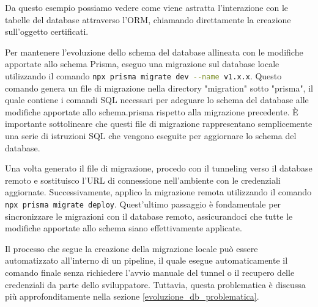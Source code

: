 

Da questo esempio possiamo vedere come viene astratta l'interazione con le tabelle del database attraverso l'ORM, chiamando direttamente la creazione sull'oggetto certificati.

\vspace{0,3cm}

Per mantenere l'evoluzione dello schema del database allineata con le modifiche apportate allo schema Prisma, eseguo una migrazione sul database locale utilizzando il comando \lstinline[language=Bash]{npx prisma migrate dev --name v1.x.x}. Questo comando genera un file di migrazione nella directory "migration" sotto "prisma", il quale contiene i comandi SQL necessari per adeguare lo schema del database alle modifiche apportate allo schema.prisma rispetto alla migrazione precedente. È importante sottolineare che questi file di migrazione rappresentano semplicemente una serie di istruzioni SQL che vengono eseguite per aggiornare lo schema del database.

Una volta generato il file di migrazione, procedo con il tunneling verso il database remoto e sostituisco l'URL di connessione nell'ambiente con le credenziali aggiornate. Successivamente, applico la migrazione remota utilizzando il comando \lstinline[language=Bash]{npx prisma migrate deploy}. Quest'ultimo passaggio è fondamentale per sincronizzare le migrazioni con il database remoto, assicurandoci che tutte le modifiche apportate allo schema siano effettivamente applicate.

Il processo che segue la creazione della migrazione locale può essere automatizzato all'interno di un pipeline, il quale esegue automaticamente il comando finale senza richiedere l'avvio manuale del tunnel o il recupero delle credenziali da parte dello sviluppatore. Tuttavia, questa problematica è discussa più approfonditamente nella sezione \ref{evoluzione_db_problematica}.
